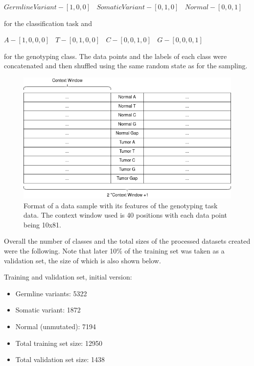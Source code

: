 \documentclass[bsc,frontabs,singlespacing,parskip,deptreport]{infthesis}
\begin{document}
\begin{center}
$ Germline Variant - [1,0,0] ~~~~ Somatic Variant - [0,1,0] ~~~~ Normal - [0,0,1] $
\end{center}

for the classification task and

\begin{center}
$ A - [1,0,0,0] ~~~~ T - [0,1,0,0] ~~~~ C - [0,0,1,0] ~~~~ G - [0,0,0,1] $
\end{center}

for the genotyping class. The data points and the labels of each class were concatenated and then shuffled using the same random state as for the sampling.

\begin{figure}
\centering
\includegraphics[width = 5in]{genotyping_features}
\setlength{\belowcaptionskip}{0pt}
\caption{Format of a data sample with its features of the genotyping task data. The context window used is 40 positions with each data point being 10x81.}
\label{classification_features}
\vskip -5mm
\end{figure}

Overall the number of classes and the total sizes of the processed datasets created were the following. Note that later 10\% of the training set was taken as a validation set, the size of which is also shown below.

Training and validation set, initial version:

\begin{itemize}

\item Germline variants: 5322 
\item Somatic variant: 1872 
\item Normal (unmutated): 7194 
\item Total training set size: 12950 
\item Total validation set size: 1438

\end{itemize}
\end{document}

